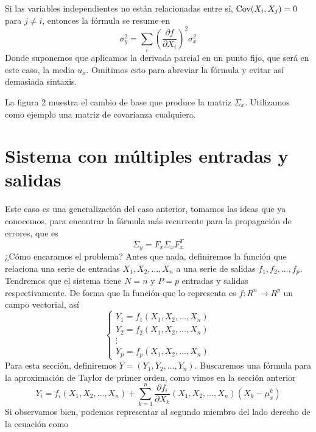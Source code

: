 \documentclass[a4paper, 10pt]{article}
\begin{document}
Si las variables independientes no están relacionadas entre sí, $\textnormal{Cov}(X_i, X_j) = 0$ para $j\neq i$,
entonces la fórmula se resume en
\begin{equation}
    \sigma_y^{2} = \sum_{i}^{}\left(\dfrac{\partial f}{\partial X_i}\right)^{2}\sigma^{2}_x
\end{equation}
Donde suponemos que aplicamos la derivada parcial en un punto fijo, que será en este caso, la media $u_x$.
Omitimos esto para abreviar la fórmula y evitar así demasiada sintaxis.

La figura 2 muestra el cambio de base que produce la matriz $\Sigma_x$. Utilizamos como ejemplo una matriz de covarianza cualquiera.

\section{Sistema con múltiples entradas y salidas}
Este caso es una generalización del caso anterior, tomamos las ideas que ya conocemos, para encontrar la fórmula
más recurrente para la propagación de errores, que es
\begin{equation}
    \Sigma_y = F_x \Sigma_x F_x^{T}
\end{equation}
¿Cómo encaramos el problema? Antes que nada, definiremos la función que relaciona una serie de entradas $X_1,X_2,\dots,X_n$ a una serie de salidas $f_1,f_2,\dots,f_p$.
Tendremos que el sistema tiene $N=n$ y $P=p$ entradas y salidas respectivamente. De forma que la función que lo representa es $f:R^{n} \to R^{p}$ un campo vectorial, así
\begin{equation}
    \begin{cases}
        Y_1 = f_1(X_1,X_2,\dots,X_n) \\
        Y_2 = f_2(X_1,X_2,\dots,X_n) \\
        \vdots                       \\
        Y_p = f_p(X_1,X_2,\dots,X_n)
    \end{cases}
\end{equation}
Para esta sección, definiremos $Y=\left(Y_1,Y_2,\dots,Y_n\right)$.
Buscaremos una fórmula para la aproximación de Taylor de primer orden, como vimos en la sección anterior
\begin{equation}
    Y_i = f_i(X_1,X_2,\dots,X_n) + \sum_{k=1}^{n}{\dfrac{\partial f_i}{\partial X_k}
    \left(X_1,X_2,\dots,X_n\right)\left(X_k - \mu_{x}^{k}\right)}
\end{equation}
Si observamos bien, podemos representar al segundo miembro del lado derecho de la ecuación como
\end{document}
